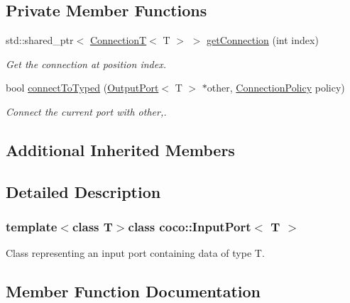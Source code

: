 \subsection*{Private Member Functions}
\begin{DoxyCompactItemize}
\item 
\hypertarget{classcoco_1_1_input_port_a4182500b2ff28fa95628d645f18ba457}{}std\+::shared\+\_\+ptr$<$ \hyperlink{classcoco_1_1_connection_t}{Connection\+T}$<$ T $>$ $>$ \hyperlink{classcoco_1_1_input_port_a4182500b2ff28fa95628d645f18ba457}{get\+Connection} (int index)\label{classcoco_1_1_input_port_a4182500b2ff28fa95628d645f18ba457}

\begin{DoxyCompactList}\small\item\em Get the connection at position {\ttfamily index}. \end{DoxyCompactList}\item 
\hypertarget{classcoco_1_1_input_port_aff01c8e8366eb6b7b5911fd10a6acc00}{}bool \hyperlink{classcoco_1_1_input_port_aff01c8e8366eb6b7b5911fd10a6acc00}{connect\+To\+Typed} (\hyperlink{classcoco_1_1_output_port}{Output\+Port}$<$ T $>$ $\ast$other, \hyperlink{structcoco_1_1_connection_policy}{Connection\+Policy} policy)\label{classcoco_1_1_input_port_aff01c8e8366eb6b7b5911fd10a6acc00}

\begin{DoxyCompactList}\small\item\em Connect the current port with {\ttfamily other},. \end{DoxyCompactList}\end{DoxyCompactItemize}
\subsection*{Additional Inherited Members}


\subsection{Detailed Description}
\subsubsection*{template$<$class T$>$class coco\+::\+Input\+Port$<$ T $>$}

Class representing an input port containing data of type T. 

\subsection{Member Function Documentation}
\hypertarget{classcoco_1_1_input_port_a0936ee02f6f53d6ba6e379477f5e223b}{}
